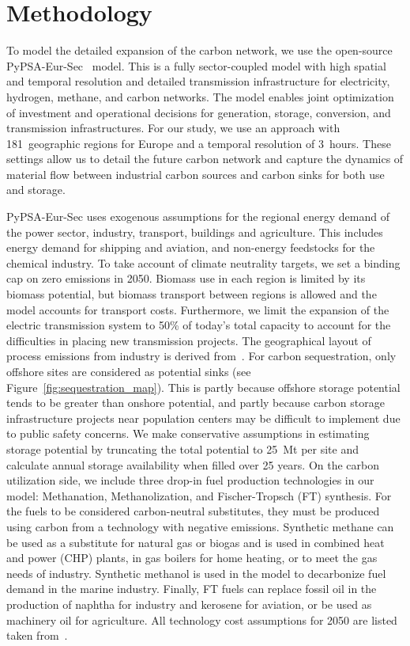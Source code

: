 \documentclass[conference]{IEEEtran}
\begin{document}
\section{Methodology}
\label{sec:methodology}

To model the detailed expansion of the carbon network, we use the open-source PyPSA-Eur-Sec~\cite{PyPSAEurSecSectorCoupledOpen2023} model. This is a fully sector-coupled model with high spatial and temporal resolution and detailed transmission infrastructure for electricity, hydrogen, methane, and carbon networks. The model enables joint optimization of investment and operational decisions for generation, storage, conversion, and transmission infrastructures. For our study, we use an approach with 181~geographic regions for Europe and a temporal resolution of 3~hours. These settings allow us to detail the future carbon network and capture the dynamics of material flow between industrial carbon sources and carbon sinks for both use and storage.

PyPSA-Eur-Sec uses exogenous assumptions for the regional energy demand of the power sector, industry, transport, buildings and agriculture. This includes energy demand for shipping and aviation, and non-energy feedstocks for the chemical industry. To take account of climate neutrality targets, we set a binding cap on zero emissions in 2050. Biomass use in each region is limited by its biomass potential, but biomass transport between regions is allowed and the model accounts for transport costs. Furthermore, we limit the expansion of the electric transmission system to 50\% of today's total capacity to account for the difficulties in placing new transmission projects. The geographical layout of process emissions from industry is derived from~\cite{piamanzGeoreferencedIndustrialSites2018}. For carbon sequestration, only offshore sites are considered as potential sinks (see Figure~\ref{fig:sequestration_map}). This is partly because offshore storage potential tends to be greater than onshore potential, and partly because carbon storage infrastructure projects near population centers may be difficult to implement due to public safety concerns. We make conservative assumptions in estimating storage potential by truncating the total potential to 25~Mt per site and calculate annual storage availability when filled over 25 years.
On the carbon utilization side, we include three drop-in fuel production technologies in our model: Methanation, Methanolization, and Fischer-Tropsch (FT) synthesis. For the fuels to be considered carbon-neutral substitutes, they must be produced using carbon from a technology with negative emissions. Synthetic methane can be used as a substitute for natural gas or biogas and is used in combined heat and power (CHP) plants, in gas boilers for home heating, or to meet the gas needs of industry. Synthetic methanol is used in the model to decarbonize fuel demand in the marine industry. Finally, FT fuels can replace fossil oil in the production of naphtha for industry and kerosene for aviation, or be used as machinery oil for agriculture.
All technology cost assumptions for 2050 are listed taken from~\cite{lisazeyenPyPSATechnologydataTechnology2023}.
\end{document}

